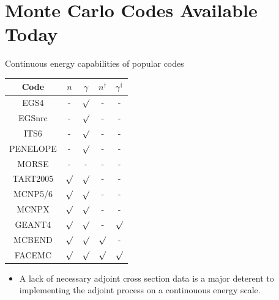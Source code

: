 \documentclass{beamer}
\begin{document}
\section{Monte Carlo Codes Available Today}
\begin{frame}{Continuous energy capabilities of popular codes}
  
  \begin{table}[ht]
    \centering
    \begin{tabular}{c c c c c }
      \hline\hline
      Code & $n$ & $\gamma$ &  $n^{\dagger}$ & $\gamma^{\dagger}$ \\ [0.5ex]
      \hline
      EGS4 & - & $\surd$ & - & - \\
      EGSnrc & - & $\surd$ & - & - \\
      ITS6 & - & $\surd$ & - & - \\
      PENELOPE & - & $\surd$ & - & - \\
      MORSE & - & - & - & - \\
      TART2005 & $\surd$ & $\surd$ & - & - \\
      MCNP5/6 & $\surd$ & $\surd$ & - & - \\
      MCNPX & $\surd$ & $\surd$ & - & - \\
      GEANT4 & $\surd$ & $\surd$ & - & $\surd$ \\
      MCBEND & $\surd$ & $\surd$ & $\surd$ & - \\ [1ex]
      \hline
      FACEMC & $\surd$ & $\surd$ & $\surd$ & $\surd$ \\ [1ex]
      \hline
    \end{tabular}
  \end{table}

\begin{itemize}
  \item A lack of necessary adjoint cross section data is a major deterent to
    implementing the adjoint process on a continouous energy scale.
\end{itemize}
  
\end{frame}

\end{document}
